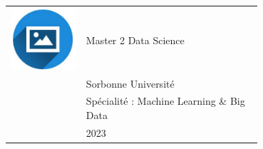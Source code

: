 \documentclass{article}
\begin{document}
\begin{paracol}{2}
 \begin{tabular}{@{}cp{0.7\linewidth}}
      \begin{minipage}{0.05\linewidth}
        \includegraphics[width=\linewidth]{picon.png}
      \end{minipage} & \vspace{-12pt}
      {\color{sidetext} {Master 2 Data Science}} \\[-6pt]
      & Sorbonne Université \\
      & Spécialité : Machine Learning \& Big Data \\
      & 2023 
    \end{tabular}


~

~


\end{paracol}
\end{document}
